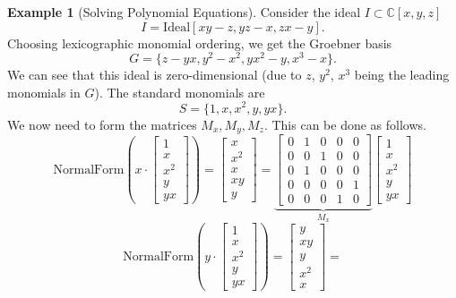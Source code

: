 \documentclass[
]{book}
\theoremstyle{definition}
\theoremstyle{definition}
\newtheorem{example}{Example}[chapter]
\theoremstyle{definition}
\theoremstyle{definition}
\theoremstyle{remark}
\begin{document}
\begin{example}[Solving Polynomial Equations]
\protect\hypertarget{exm:SolvingPolynomialSystem}{}\label{exm:SolvingPolynomialSystem}Consider the ideal \(I \subset \mathbb{C}[x,y,z]\)
\[
I = \mathrm{Ideal}[xy-z, yz -x, zx - y].
\]
Choosing lexicographic monomial ordering, we get the Groebner basis
\[
G = \{ z - yx, y^2 - x^2, yx^2 - y, x^3 - x \}.
\]
We can see that this ideal is zero-dimensional (due to \(z\), \(y^2\), \(x^3\) being the leading monomials in \(G\)). The standard monomials are
\[
S = \{ 1, x, x^2, y, yx \}.
\]
We now need to form the matrices \(M_x, M_y, M_z\).
This can be done as follows.
\[
\mathrm{NormalForm}\left(
x \cdot \begin{bmatrix}
1 \\
x \\
x^2 \\
y \\
yx 
\end{bmatrix}
\right) = 
\begin{bmatrix}
x \\
x^2 \\
x \\
xy \\
y \end{bmatrix} = 
\underbrace{\begin{bmatrix}
0 & 1 & 0 & 0 & 0 \\
0 & 0 & 1 & 0 & 0 \\
0 & 1 & 0 & 0 & 0 \\
0 & 0 & 0 & 0 & 1 \\
0 & 0 & 0 & 1 & 0 
\end{bmatrix}}_{M_x}
\begin{bmatrix}
1 \\
x \\
x^2 \\
y \\
yx 
\end{bmatrix}
\]
\[
\mathrm{NormalForm}\left(
y \cdot \begin{bmatrix}
1 \\
x \\
x^2 \\
y \\
yx 
\end{bmatrix}
\right) = 
\begin{bmatrix}
y \\
xy \\
y \\
x^2 \\
x \end{bmatrix} = 
\]
\end{example}
\end{document}
